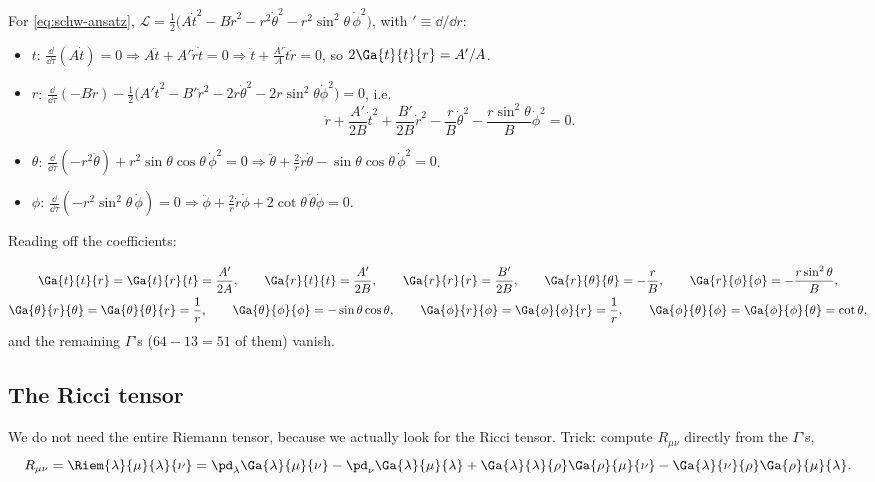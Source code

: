 For \eqref{eq:schw-ansatz}, $\mathcal L=\frac12\big(A\dot t^2-B\dot r^2-r^2\dot\theta^2-r^2\sin^2\theta\,\dot\phi^2\big)$, with $'\equiv\dd/\dd r$:
\begin{itemize}
\item $t$: $\frac{\dd}{\dd\tau}(A\dot t)=0\Rightarrow A\ddot t+A'\dot r\dot t=0\Rightarrow\ddot t+\frac{A'}{A}\dot t\dot r=0$, so $2\Ga{t}{t}{r}=A'/A$.
\item $r$: $\frac{\dd}{\dd\tau}(-B\dot r)-\frac12\big(A'\dot t^2-B'\dot r^2-2r\dot\theta^2-2r\sin^2\theta\dot\phi^2\big)=0$, i.e.
\[
  \ddot r+\frac{A'}{2B}\dot t^2+\frac{B'}{2B}\dot r^2-\frac rB\dot\theta^2-\frac{r\sin^2\theta}{B}\dot\phi^2=0 .
\]
\item $\theta$: $\frac{\dd}{\dd\tau}(-r^2\dot\theta)+r^2\sin\theta\cos\theta\,\dot\phi^2=0\Rightarrow\ddot\theta+\frac2r\dot r\dot\theta-\sin\theta\cos\theta\,\dot\phi^2=0$.
\item $\phi$: $\frac{\dd}{\dd\tau}(-r^2\sin^2\theta\,\dot\phi)=0\Rightarrow\ddot\phi+\frac2r\dot r\dot\phi+2\cot\theta\,\dot\theta\dot\phi=0$.
\end{itemize}
Reading off the coefficients:
\begin{keyresult}
\begin{gather*}
  \Ga{t}{t}{r}=\Ga{t}{r}{t}=\frac{A'}{2A},\qquad
  \Ga{r}{t}{t}=\frac{A'}{2B},\qquad\Ga{r}{r}{r}=\frac{B'}{2B},\qquad\Ga{r}{\theta}{\theta}=-\frac rB,\qquad\Ga{r}{\phi}{\phi}=-\frac{r\sin^2\theta}{B},\\
  \Ga{\theta}{r}{\theta}=\Ga{\theta}{\theta}{r}=\frac1r,\qquad\Ga{\theta}{\phi}{\phi}=-\sin\theta\cos\theta,\qquad
  \Ga{\phi}{r}{\phi}=\Ga{\phi}{\phi}{r}=\frac1r,\qquad\Ga{\phi}{\theta}{\phi}=\Ga{\phi}{\phi}{\theta}=\cot\theta,
\end{gather*}
and the remaining $\Gamma$'s ($64-13=51$ of them) vanish.
\end{keyresult}

\subsection{The Ricci tensor}
We do not need the entire Riemann tensor, because we actually look for the Ricci tensor. Trick: compute $R_{\mu\nu}$ directly from the $\Gamma$'s,
\begin{equation}
  R_{\mu\nu}=\Riem{\lambda}{\mu}{\lambda}{\nu}=\pd_\lambda\Ga{\lambda}{\mu}{\nu}-\pd_\nu\Ga{\lambda}{\mu}{\lambda}+\Ga{\lambda}{\lambda}{\rho}\Ga{\rho}{\mu}{\nu}-\Ga{\lambda}{\nu}{\rho}\Ga{\rho}{\mu}{\lambda}.
  \label{eq:ricci-from-gamma}
\end{equation}

